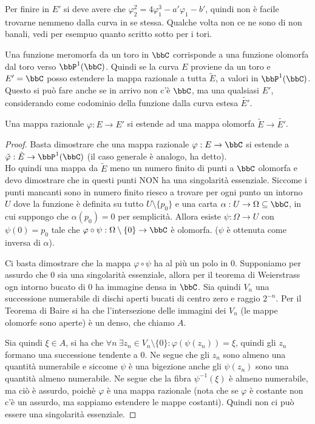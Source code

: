 \begin{osservazione}
Per finire in $E'$ si deve avere che $\varphi_2^2=4\varphi_1^3-a'\varphi_1-b'$, quindi non è facile trovarne nemmeno dalla curva in se stessa. Qualche volta non ce ne sono di non banali, vedi per esempuo quanto scritto sotto per i tori.
\end{osservazione}

Una funzione meromorfa da un toro in $\bbC$ corrisponde a una funzione olomorfa dal toro verso $\bbP^1(\bbC)$.
Quindi se la curva $E$ proviene da un toro e $E'=\bbC$ posso estendere la mappa razionale a tutta $\tilde{E}$, a valori in $\bbP^1(\bbC)$.
Questo si può fare anche se in arrivo non c'è $\bbC$, ma una qualsiasi $E'$, considerando come codominio della funzione dalla curva estesa $\tilde{E'}$.

\begin{proposizione}
Una mappa razionale $\varphi: E\rightarrow E'$ si estende ad una mappa olomorfa $\tilde{E} \rightarrow \tilde {E'}$.
\end{proposizione}

\begin{proof}
Basta dimostrare che una mappa razionale $\varphi:E\rightarrow \bbC$ si estende a $\tilde{\varphi}:\tilde{E}\rightarrow\bbP^1(\bbC)$ (il caso generale è analogo, ha detto).\\
Ho quindi una mappa da $\tilde{E}$ meno un numero finito di punti a $\bbC$ olomorfa e devo dimostrare che in questi punti NON ha una singolarità essenziale. Siccome i punti mancanti sono in numero finito riesco a trovare per ogni punto un intorno $U$ dove la funzione è definita su tutto $U \setminus \{ p_0\}$ e una carta $\alpha: U\rightarrow \Omega\subseteq\bbC$, in cui suppongo che $\alpha(p_0)=0$ per semplicità. Allora esiste $\psi:\Omega\rightarrow U$ con $\psi(0)=p_0$ tale che $\varphi\circ\psi:\Omega \setminus \{ 0\}\rightarrow \bbC$ è olomorfa. ($\psi$ è ottenuta come inversa di $\alpha$).

Ci basta dimostrare che la mappa $\varphi\circ\psi$ ha al più un polo in $0$.
Supponiamo per assurdo che $0$ sia una singolarità essenziale, allora per il teorema di Weierstrass ogn intorno bucato di $0$ ha immagine densa in $\bbC$. Sia quindi $V_n$ una successione numerabile di dischi aperti bucati di centro zero e raggio $2^{-n}$. Per il Teorema di Baire si ha che l'intersezione delle immagini dei $V_n$ (le mappe olomorfe sono aperte) è un denso, che chiamo $A$.

Sia quindi $\xi\in A$, si ha che $\forall n \ \exists z_n\in V_n \setminus \{ 0 \} : \varphi ( \psi(z_n ))=\xi$, quindi gli $z_n$ formano una successione tendente a $0$. Ne segue che gli $z_n$ sono almeno una quantità numerabile e siccome $\psi$ è una bigezione anche gli $\psi(z_n)$ sono una quantità almeno numerabile. Ne segue che la fibra $\psi^{-1} (\xi )$ è almeno numerabile, ma ciò è assurdo, poichè $\varphi$ è una mappa razionale (nota che se $\varphi$ è costante non c'è un assurdo, ma sappiamo estendere le mappe costanti). Quindi non ci può essere una singolarità essenziale.
\end{proof}


